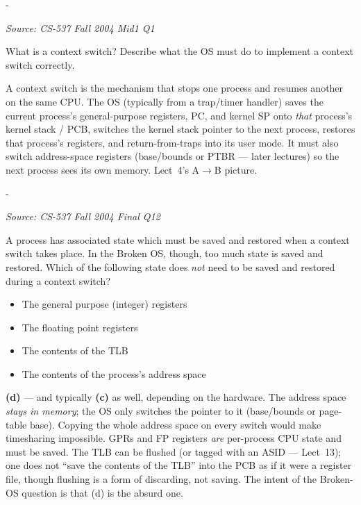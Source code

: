 \documentclass[11pt,a4paper]{article}
\makeatletter
\newcommand{\keepspace}[1]{\par\penalty-100\begingroup
  \setlength{\dimen@}{#1}\dimen@ii\pagegoal\advance\dimen@ii-\pagetotal
  \ifdim\dimen@>\dimen@ii\ifdim\dimen@ii>\z@\vfil\fi\break\fi\endgroup}
\newcounter{qn}[section]
\newenvironment{Qn}[4]{%
  \refstepcounter{qn}\keepspace{7\baselineskip}%
  \begin{tcolorbox}[qboxstyle, title={Q\thesection.\theqn\ \ [#1 \textbar\ #2]\ \ #4}]%
  {\footnotesize\color{g3}\textit{Source: #3}}\par\smallskip%
}{%
  \end{tcolorbox}%
}
\newenvironment{Sol}{%
  \begin{tcolorbox}[sboxstyle, title={Solution}]%
}{%
  \end{tcolorbox}\vspace{0.35em}%
}
\makeatother
\begin{document}
\begin{Qn}{Easy-Medium}{Lect 4}{CS-537 Fall 2004 Mid1 Q1}{What is a context switch?}
What is a context switch? Describe what the OS must do to implement a context switch correctly.
\end{Qn}
\begin{Sol}
A context switch is the mechanism that stops one process and resumes another on the same CPU. The OS (typically from a trap/timer handler) saves the current process's general-purpose registers, PC, and kernel SP onto \emph{that} process's kernel stack / PCB, switches the kernel stack pointer to the next process, restores that process's registers, and return-from-traps into its user mode. It must also switch address-space registers (base/bounds or PTBR --- later lectures) so the next process sees its own memory. Lect~4's A$\to$B picture.
\end{Sol}

\begin{Qn}{Easy-Medium}{Lect 4}{CS-537 Fall 2004 Final Q12}{What does \emph{not} need to be saved on a context switch?}
A process has associated state which must be saved and restored when a context switch takes place. In the Broken OS, though, too much state is saved and restored. Which of the following state does \emph{not} need to be saved and restored during a context switch?
\begin{itemize}
  \item[(a)] The general purpose (integer) registers
  \item[(b)] The floating point registers
  \item[(c)] The contents of the TLB
  \item[(d)] The contents of the process's address space
\end{itemize}
\end{Qn}
\begin{Sol}
\textbf{(d)} --- and typically \textbf{(c)} as well, depending on the hardware. The address space \emph{stays in memory}; the OS only switches the pointer to it (base/bounds or page-table base). Copying the whole address space on every switch would make timesharing impossible. GPRs and FP registers \emph{are} per-process CPU state and must be saved. The TLB can be flushed (or tagged with an ASID --- Lect~13); one does not ``save the contents of the TLB'' into the PCB as if it were a register file, though flushing is a form of discarding, not saving. The intent of the Broken-OS question is that (d) is the absurd one.
\end{Sol}
\end{document}
